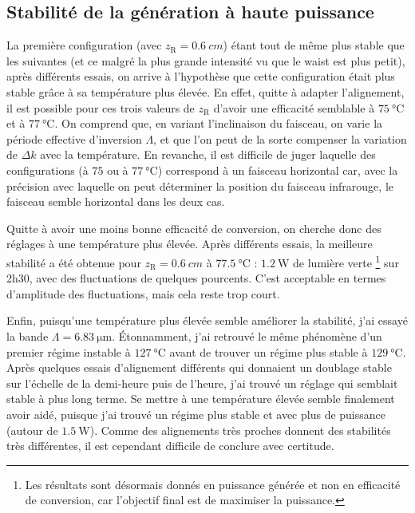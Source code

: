 \documentclass[11pt,a4paper]{article}
\newcommand{\zr}{z_\mathsc{R}}
\newcommand{\mathsc}[1]{\mathrm{\scriptscriptstyle {#1}}}
\begin{document}
\subsection{Stabilité de la génération à haute puissance}

La première configuration (avec $\zr=\SI{0.6}{cm}$) étant tout de même plus stable que les suivantes (et ce malgré la plus grande intensité vu que le waist est plus petit), après différents essais, on arrive à l'hypothèse que cette configuration était plus stable grâce à sa température plus élevée. En effet, quitte à adapter l'alignement, il est possible pour ces trois valeurs de $\zr$ d'avoir une efficacité semblable à $\SI{75}{\celsius}$ et à $\SI{77}{\celsius}$. On comprend que, en variant l'inclinaison du faisceau, on varie la période effective d'inversion $\Lambda$, et que l'on peut de la sorte compenser la variation de $\Delta k$ avec la température. En revanche, il est difficile de juger laquelle des configurations (à $75$ ou à $\SI{77}{\celsius}$) correspond à un faisceau horizontal car, avec la précision avec laquelle on peut déterminer la position du faisceau infrarouge, le faisceau semble horizontal dans les deux cas. 

Quitte à avoir une moins bonne efficacité de conversion, on cherche donc des réglages à une température plus élevée. Après différents essais, la meilleure stabilité a été obtenue pour $\zr=\SI{0.6}{cm}$ à $\SI{77.5}{\celsius}$ : $\SI{1.2}{\watt}$ de lumière verte \footnote{Les résultats sont désormais donnés en puissance générée et non en efficacité de conversion, car l'objectif final est de maximiser la puissance.} sur 2h30, avec des fluctuations de quelques pourcents. C'est acceptable en termes d'amplitude des fluctuations, mais cela reste trop court.

Enfin, puisqu'une température plus élevée semble améliorer la stabilité, j'ai essayé la bande $\Lambda=\SI{6.83}{\micro\meter}$.%
Étonnamment, j'ai retrouvé le même phénomène d'un premier régime instable à $\SI{127}{\celsius}$ avant de trouver un régime plus stable à $\SI{129}{\celsius}$. Après quelques essais d'alignement différents qui donnaient un doublage stable sur l'échelle de la demi-heure puis de l'heure, j'ai trouvé un réglage qui semblait stable à plus long terme. Se mettre à une température élevée semble finalement avoir aidé, puisque j'ai trouvé un régime plus stable et avec plus de puissance (autour de $\SI{1.5}{\watt}$). Comme des alignements très proches donnent des stabilités très différentes, il est cependant difficile de conclure avec certitude.
\end{document}

